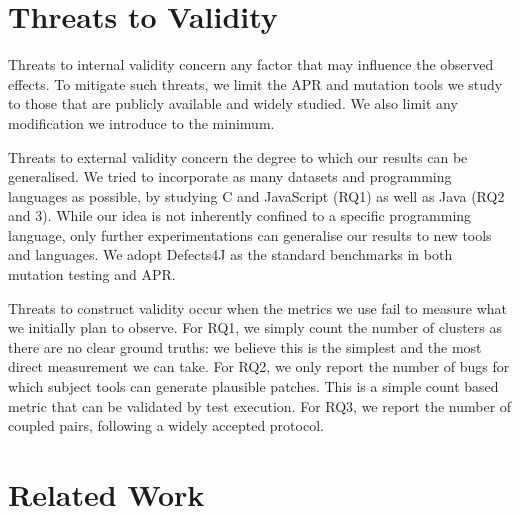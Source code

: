 \documentclass[conference]{IEEEtran}
\def\d4j{Defects4J\xspace}
\newcommand{\fixme}[1]{\textcolor{red}{\textbf{fixme:}#1}}
\begin{document}


\section{Threats to Validity}
\label{sec:threats}
Threats to internal validity concern any factor that may influence the observed 
effects. To mitigate such threats, we limit the APR and mutation tools we study 
to those that are publicly available and widely studied. We also limit any 
modification we introduce to the minimum. 

Threats to external validity concern the degree to which our results can be
generalised. We tried to incorporate as many datasets and programming languages
as possible, by studying C and JavaScript (RQ1) as well as Java (RQ2 and 3).
While our idea is not inherently confined to a specific programming language,
only further experimentations can generalise our results to new tools and
languages. We adopt \d4j as the standard benchmarks in both mutation testing and APR.

Threats to construct validity occur when the metrics we use fail to measure what
we initially plan to observe. For RQ1, we simply count the number of clusters as
there are no clear ground truths: we believe this is the simplest and the most
direct measurement we can take. For RQ2, we only report the number of bugs for
which subject tools can generate plausible patches. This is a simple count
based metric that can be validated by test execution. For RQ3, we report the
number of coupled pairs, following a widely accepted protocol.

\section{Related Work}
\label{sec:related_work}
\end{document}
